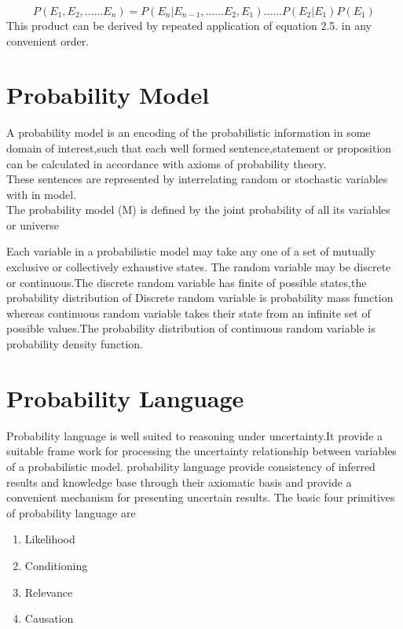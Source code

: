 \begin{equation*}
    P(E{_1},E{_2},......E{_n})=P(E_{n}|E_{n-1},......E{_2},E{_1})......P(E{_2}|E{_1})P(E{_1})
\end{equation*}
This product can be derived by repeated application of equation 2.5. in any convenient order.
\section{Probability Model}

A probability model is an encoding of the probabilistic information in some domain of interest,such that each well formed sentence,statement or proposition can be calculated in accordance with axioms of probability theory.
\\These sentences are represented by interrelating random or stochastic variables with in model.
\\The  probability model (M) is defined by the joint probability of all its variables or universe


Each variable in a probabilistic model may take any one of a set of mutually exclusive or collectively
exhaustive states.
The random variable may be discrete or continuous.The discrete random variable has finite of possible states,the probability distribution of Discrete random variable is probability mass function whereas continuous random variable takes their state from an infinite set of possible values.The probability distribution of continuous random variable is probability density function.
\section{Probability Language}

Probability language is well suited to reasoning under uncertainty.It provide a suitable frame work for processing the uncertainty relationship between variables of a probabilistic model.
probability language provide consistency of inferred results and knowledge base through their axiomatic basis and provide a convenient mechanism for presenting uncertain results.
The basic four primitives of probability language are\begin{enumerate}
                                                      \item Likelihood
                                                      \item Conditioning
                                                      \item Relevance
                                                     \item Causation
                                                     \end{enumerate}

